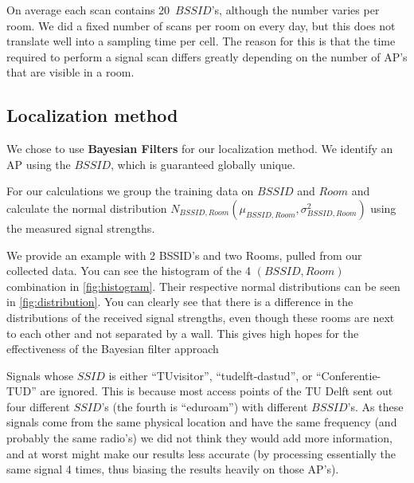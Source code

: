 \documentclass[a4paper,10pt,twoside]{IEEEtran}
\begin{document}
On average each scan contains 20~$BSSID$'s, although the number varies per room.
We did a fixed number of scans per room on every day, but this does not translate well into a sampling time per cell.
The reason for this is that the time required to perform a signal scan
differs greatly depending on the number of AP's that are visible in a room.

\subsection{Localization method}
\label{sec:loc-data}

We chose to use \textbf{Bayesian Filters} for our localization method. We identify an AP using the $BSSID$, which is guaranteed globally unique.

For our calculations we group the training data on $BSSID$ and $Room$ and calculate the normal distribution $N_{BSSID,Room}(\mu_{BSSID,Room}, \sigma^2_{BSSID,Room})$ using the measured signal strengths.

We provide an example with 2 BSSID's and two Rooms, pulled from our collected data.
You can see the histogram of the 4 $(BSSID, Room)$ combination in \autoref{fig:histogram}.
Their respective normal distributions can be seen in \autoref{fig:distribution}.
 You can clearly see that there is a difference in the distributions of the received signal strengths, even though these rooms are next to each other and not separated by a wall.
 This gives high hopes for the effectiveness of the Bayesian filter approach

Signals whose $SSID$ is either ``TUvisitor'', ``tudelft-dastud'',
or ``Conferentie-TUD'' are ignored.
This is because most access points of the TU Delft sent out four different $SSID$'s (the fourth is ``eduroam'') with different $BSSID$'s.
As these signals come from the same physical location and have the same
frequency (and probably the same radio's) we did not think they would add more
information, and at worst might make our results less accurate (by processing
essentially the same signal 4 times, thus biasing the results heavily on those AP's).
\end{document}
